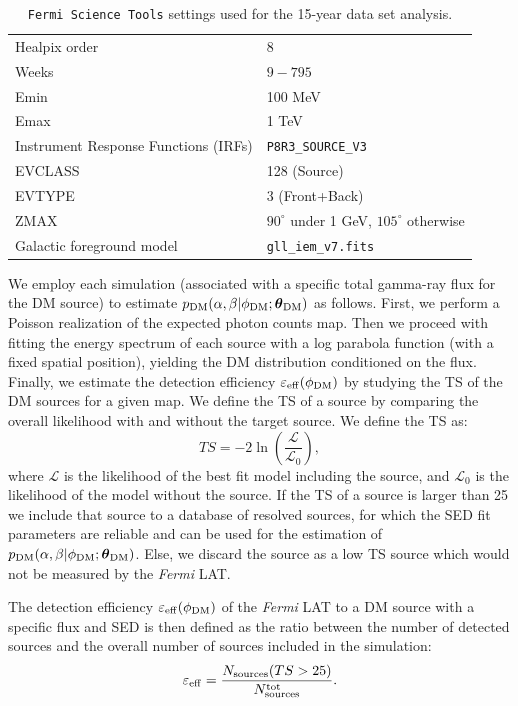 \documentclass[12pt, a4paper]{article}
\newcommand{\Fermi}{{\sl Fermi}}
\newcommand{\be}{\begin{equation}}
\newcommand{\ee}{\end{equation}}
\newcommand{\btheta}{\boldsymbol{\theta}}
\begin{document}
\begin{table}[t]
\centering
\begin{tabular}{ | l| l|  }
\hline
Healpix order & 8\\ 
Weeks & $9-795$\\ 
Emin & 100 MeV\\
Emax & 1 TeV\\
Instrument Response Functions (IRFs) & \texttt{P8R3\_SOURCE\_V3} \\
EVCLASS & 128 (Source)\\ 
EVTYPE & 3 (Front+Back)\\
ZMAX & $90^\circ$ under 1 GeV, $105^\circ$ otherwise\\
Galactic foreground model & \verb|gll_iem_v7.fits| \\
\hline
\end{tabular}
\caption{\texttt{Fermi Science Tools} settings used for the 15-year data set analysis.}
\label{tab:settings}
\end{table}

We employ each simulation (associated with a specific total gamma-ray flux for the DM source) to estimate $p_{\rm DM}(\alpha,\beta|\phi_{\rm DM};\btheta_{\rm DM})$ as follows.
First, we perform a Poisson realization of the expected photon counts map.
Then we proceed with fitting the energy spectrum of each source with a log parabola function (with a fixed spatial position), yielding the DM distribution conditioned on the flux.
Finally, we estimate the detection efficiency $\varepsilon_{\rm eff}(\phi_{\rm DM})$ by studying the TS of the DM sources for a given map. We define the TS of a source by comparing the overall likelihood with and without the target source. We define the TS as:
\begin{equation}
TS = -2\ln\left(\frac{\mathcal{L}}{\mathcal{L}_0}\right),
\end{equation}
where $\mathcal{L}$ is the likelihood of the best fit model including the source, and $\mathcal{L}_0$ is the likelihood of the model without the source. 
If the TS of a source is larger than 25 we include that source to a database of resolved sources, for which the SED fit parameters are reliable and can be used for the estimation of $p_{\rm DM}(\alpha,\beta|\phi_{\rm DM};\btheta_{\rm DM})$. Else, we discard the source as a low TS source which would not be measured by the {\Fermi} LAT.

The detection efficiency $\varepsilon_{\rm eff}(\phi_{\rm DM})$ of the {\Fermi} LAT to a DM source with a specific flux and SED is then defined as the ratio between the number of detected sources and the overall number of sources included in the simulation: 
\be
\varepsilon_{\rm eff} = \frac{N_{\rm sources}(TS>25)}{N_{\rm sources}^{\rm tot}}.
\ee
\end{document}

